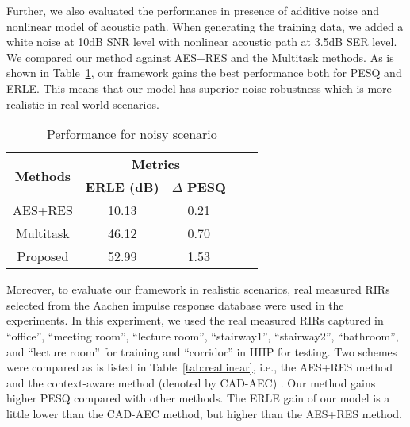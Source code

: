 \documentclass{article}
\begin{document}
\begin{sloppy}
Further, we also evaluated the performance in presence of additive noise and nonlinear model of acoustic path. When generating the training data, we added a white noise at 10dB SNR level with nonlinear acoustic path at 3.5dB SER level. We compared our method against AES+RES and the Multitask methods. As is shown in Table~\ref{tab:noisy}, our framework gains the best performance both for PESQ and ERLE. This means that our model has superior noise robustness which is more realistic in real-world scenarios.

\begin{table}[htb]
\setlength{\abovecaptionskip}{0.2cm}
\setlength{\belowcaptionskip}{0.2cm}
\centering
\caption{Performance for noisy scenario}
\label{tab:noisy}
\begin{tabular}{|c|c|c|c|c|}
\hline
\multirow{2}{*}{\textbf{Methods}}  & \multicolumn{2}{c|}{\textbf{Metrics}} \\ \cline{2-3}
& \textbf{ERLE (dB)}   & \textbf{\textbf{$\Delta$ PESQ}}  \\ \hline \hline
AES+RES    & 10.13   & 0.21    \\ \hline
Multitask   & 46.12 & 0.70     \\ \hline
Proposed   & 52.99  & 1.53  \\ \hline
\end{tabular}
\end{table}

Moreover, to evaluate our framework in realistic scenarios, real measured RIRs selected from the Aachen impulse response database \cite{realRIR} were used in the experiments. In this experiment, we used the real measured RIRs captured in ``office'', ``meeting room'', ``lecture room'', ``stairway1'', ``stairway2'', ``bathroom'', and ``lecture room'' for training and ``corridor'' in HHP for testing. Two schemes were compared as is listed in Table~\ref{tab:reallinear}, i.e., the AES+RES method and the context-aware method (denoted by CAD-AEC) \cite{Fazel1}. Our method gains higher PESQ compared with other methods. The ERLE gain of our model is a little lower than the CAD-AEC method, but higher than the AES+RES method.


\end{sloppy}
\end{document}
